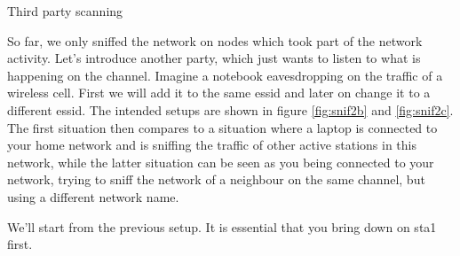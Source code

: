 \begin{exercise}{Third party scanning}
	\label{ex:secondAP}
	
So far, we only sniffed the network on nodes which took part of the network activity. Let's introduce another party, which just wants to listen to what is happening on the channel. Imagine a notebook eavesdropping on the traffic of a wireless cell. First we will add it to the same \ac{essid} and later on change it to a different \ac{essid}.  The intended setups are shown in figure \ref{fig:snif2b} and \ref{fig:snif2c}. The first situation then compares to a situation where a laptop is connected to your home network and is sniffing the traffic of other active stations in this network, while the latter situation can be seen as you being connected to your network, trying to sniff the network of a neighbour on the same channel, but using a different network name.
	
	We'll start from the previous setup.\newline
	\remark It is essential that you bring  down on \ac{sta}1 first. 


\end{exercise}
